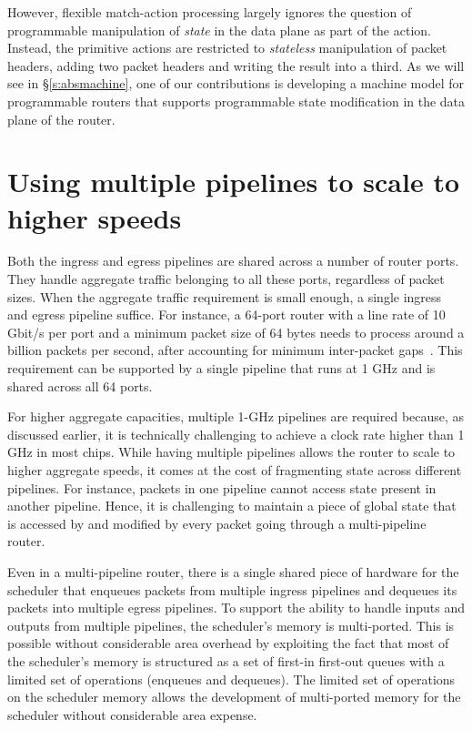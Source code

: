 However, flexible match-action processing largely ignores the question of
programmable manipulation of {\em state} in the data plane as part of the
action.  Instead, the primitive actions are restricted to {\em stateless}
manipulation of packet headers, \eg adding two packet headers and writing the
result into a third. As we will see in \S\ref{s:absmachine}, one of our
contributions is developing a machine model for programmable routers that
supports programmable state modification in the data plane of the router. 

\section{Using multiple pipelines to scale to higher speeds}
\label{s:router_multi_pipeline_arch}

Both the ingress and egress pipelines are shared across a number of router
ports.  They handle aggregate traffic belonging to all these ports, regardless
of packet sizes. When the aggregate traffic requirement is small enough, a
single ingress and egress pipeline suffice. For instance, a 64-port router with
a line rate of 10 Gbit/s per port and a minimum packet size of 64 bytes needs
to process around a billion packets per second, after accounting for minimum
inter-packet gaps~\cite{rmt}.  This requirement can be supported by a single
pipeline that runs at 1 GHz and is shared across all 64 ports.

For higher aggregate capacities, multiple 1-GHz pipelines are required because,
as discussed earlier, it is technically challenging to achieve a clock rate
higher than 1 GHz in most chips. While having multiple pipelines allows the
router to scale to higher aggregate speeds, it comes at the cost of fragmenting
state across different pipelines.  For instance, packets in one pipeline cannot
access state present in another pipeline. Hence, it is challenging to maintain
a piece of global state that is accessed by and modified by every packet going
through a multi-pipeline router.

Even in a multi-pipeline router, there is a single shared piece of hardware for
the scheduler that enqueues packets from multiple ingress pipelines and
dequeues its packets into multiple egress pipelines. To support the ability to
handle inputs and outputs from multiple pipelines, the scheduler's memory is
multi-ported.  This is possible without considerable area overhead by
exploiting the fact that most of the scheduler's memory is structured as a set
of first-in first-out queues with a limited set of operations (\eg enqueues and
dequeues). The limited set of operations on the scheduler memory allows the
development of multi-ported memory for the scheduler without considerable area
expense.


